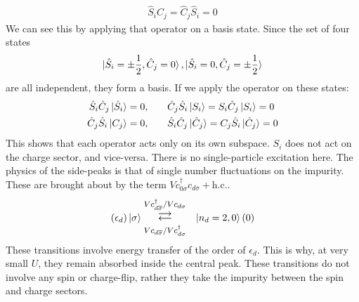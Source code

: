 \documentclass[12pt,twoside]{report}
\numberwithin{equation}{section}
\begin{document}
\begin{equation}\begin{aligned}
	\hat S_i \hat C_j = \hat C_j \hat S_i = 0
\end{aligned}\end{equation}
We can see this by applying that operator on a basis state. Since the set of four states 
\begin{equation}\begin{aligned}
	\ket{\hat S_i = \pm \frac{1}{2}, \hat C_j = 0}, \ket{\hat S_i = 0, \hat C_j = \pm\frac{1}{2}}
\end{aligned}\end{equation}
are all independent, they form a basis. If we apply the operator on these states:
\begin{equation}\begin{aligned}
	\hat S_i \hat C_j \ket{\hat S_i} &= 0, &&&&\hat C_j \hat S_i \ket{S_i} = S_i \hat C_j \ket{S_i} = 0\\
	\hat C_j \hat S_i \ket{C_j} &= 0, &&&&\hat S_i \hat C_j \ket{\hat C_j} = C_j \hat S_i \ket{\hat C_j} = 0 \\
\end{aligned}\end{equation}
This shows that each operator acts only on its own subspace. \(S_i\) does not act on the charge sector, and vice-versa. There is no single-particle excitation here.
\pb The physics of the side-peaks is that of single number fluctuations on the impurity. These are brought about by the term \(Vc^\dagger_{0\sigma}c_{d\sigma} + \text{h.c.}\).
\begin{equation}\begin{aligned}
	\left( \epsilon_d  \right) \ket{\sigma} & \mathrel{\mathlarger{\mathlarger{\mathop{\rightleftarrows}}^{V c^\dagger_{d\overline\sigma}/V c_{d\sigma}}_{V c_{d\overline\sigma}/V c^\dagger_{d\sigma}}}} &\ket{n_d=2,0} \left( 0 \right) \\
\end{aligned}\end{equation}
These transitions involve energy transfer of the order of \(\epsilon_d\). This is why, at very small \(U\), they remain absorbed inside the central peak. These transitions do not involve any spin or charge-flip, rather they take the impurity between the spin and charge sectors.
\end{document}
